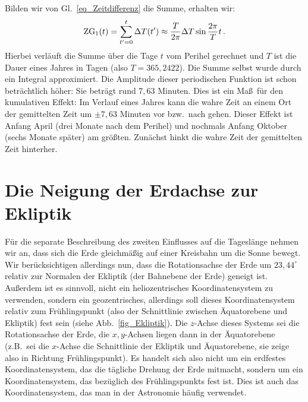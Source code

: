 Bilden wir von Gl.\ \ref{eq_Zeitdifferenz} die Summe, erhalten wir:
\begin{equation}
     {\rm ZG}_1(t) = \sum_{t'=0}^t \Delta T(t')  \approx  \frac{T}{2\pi} \Delta T \sin \frac{2\pi}{T}t  \, .
\end{equation}
Hierbei verl\"auft die Summe \"uber die Tage $t$ vom Perihel gerechnet und $T$ ist die Dauer eines
Jahres in Tagen (also $T=365,2422$). Die Summe selbst wurde durch ein Integral approximiert. 
Die Amplitude dieser periodischen Funktion ist schon betr\"achtlich h\"oher: Sie betr\"agt rund
$7,63$ Minuten. Dies ist ein Ma\ss\ f\"ur den kumulativen Effekt: Im Verlauf eines Jahres kann die
wahre Zeit an einem Ort der gemittelten Zeit um $\pm 7,63$ Minuten vor bzw.\ nach gehen. 
Dieser Effekt ist Anfang April (drei Monate nach dem Perihel) und nochmals Anfang Oktober (sechs
Monate sp\"ater) am gr\"o\ss ten. Zun\"achst hinkt die wahre Zeit der gemittelten Zeit hinterher. 

\section{Die Neigung der Erdachse zur Ekliptik}
\label{sec_Neigung}

F\"ur 
die separate Beschreibung des zweiten Einflusses auf die Tagesl\"ange nehmen wir an, dass sich
die Erde gleichm\"a\ss ig auf einer Kreisbahn um die Sonne bewegt. Wir ber\"ucksichtigen allerdings
nun, dass die Rotationsachse der Erde um $23,44^\circ$ relativ zur Normalen der Ekliptik (der Bahnebene 
der Erde) geneigt ist. Au\ss erdem ist es sinnvoll, nicht ein heliozentrisches Koordinatensystem
zu verwenden, sondern ein geozentrisches, allerdings soll dieses Koordinatensystem relativ zum
Fr\"uhlingspunkt (also der Schnittlinie zwischen \"Aquatorebene und Ekliptik) fest sein 
(siehe Abb.\ \ref{fig_Ekliptik}). 
Die $z$-Achse dieses Sys\-tems sei die Rotationsachse der Erde, die $x,y$-Achsen liegen dann in
der \"Aquatorebene (z.B.\ sei die $x$-Achse die Schnittlinie der Ekliptik und \"Aquatorebene, sie
zeige also in Richtung Fr\"uhlingspunkt). Es handelt sich also nicht um ein erdfestes
Koordinatensystem, das die t\"agliche Drehung der Erde mitmacht, sondern um ein Koordinatensystem,
das bez\"uglich des Fr\"uhlingspunkts fest ist. Dies ist auch das Koordinatensystem, das man
in der Astronomie h\"aufig verwendet. 

